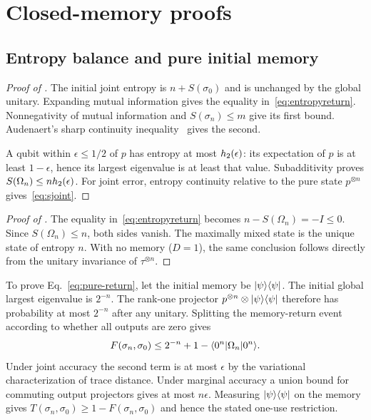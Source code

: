 \section{Closed-memory proofs}\label{app:general}
\subsection{Entropy balance and pure initial memory}
\begin{proof}[Proof of ]
The initial joint entropy is $n+S(\sigma_0)$ and is unchanged by the global unitary. Expanding mutual information gives the equality in~\eqref{eq:entropyreturn}. Nonnegativity of mutual information and $S(\sigma_n)\le m$ give its first bound. Audenaert's sharp continuity inequality~\cite{audenaert} gives the second.

A qubit within $\epsilon\le1/2$ of $p$ has entropy at most $h_2(\epsilon)$: its expectation of $p$ is at least $1-\epsilon$, hence its largest eigenvalue is at least that value. Subadditivity proves $S(\Omega_n)\le nh_2(\epsilon)$. For joint error, entropy continuity relative to the pure state $p^{\otimes n}$ gives~\eqref{eq:sjoint}.
\end{proof}
\begin{proof}[Proof of ]
The equality in~\eqref{eq:entropyreturn} becomes $n-S(\Omega_n)=-I\le0$. Since $S(\Omega_n)\le n$, both sides vanish. The maximally mixed state is the unique state of entropy $n$. With no memory ($D=1$), the same conclusion follows directly from the unitary invariance of $\tau^{\otimes n}$.
\end{proof}

To prove Eq.~\eqref{eq:pure-return}, let the initial memory be $|\psi\rangle\langle\psi|$. The initial global largest eigenvalue is $2^{-n}$. The rank-one projector $p^{\otimes n}\otimes|\psi\rangle\langle\psi|$ therefore has probability at most $2^{-n}$ after any unitary. Splitting the memory-return event according to whether all outputs are zero gives
\begin{equation}
 F(\sigma_n,\sigma_0)\le2^{-n}+1-\langle0^n|\Omega_n|0^n\rangle.
\end{equation}
Under joint accuracy the second term is at most $\epsilon$ by the variational characterization of trace distance. Under marginal accuracy a union bound for commuting output projectors gives at most $n\epsilon$. Measuring $|\psi\rangle\langle\psi|$ on the memory gives $T(\sigma_n,\sigma_0)\ge1-F(\sigma_n,\sigma_0)$ and hence the stated one-use restriction.

